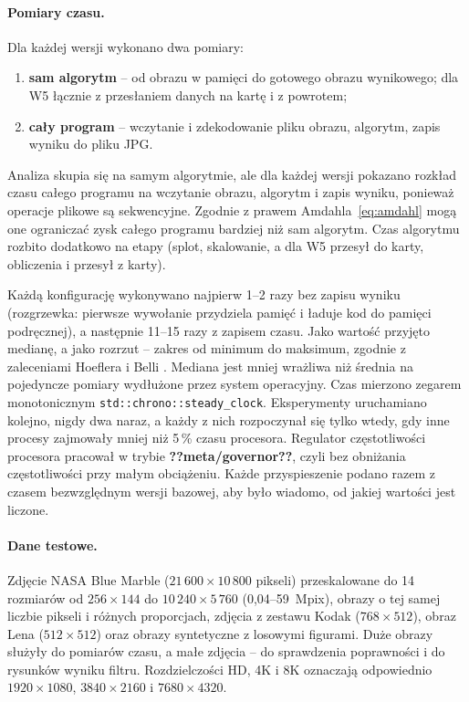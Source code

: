 \documentclass[12pt,a4paper]{article}
\providecommand{\wynik}[1]{\textbf{??#1??}}
\newcommand{\kod}[1]{\texttt{#1}}
\begin{document}
\paragraph{Pomiary czasu.} Dla każdej wersji wykonano dwa pomiary:
\begin{enumerate}
	\item \textbf{sam algorytm} -- od obrazu w pamięci do gotowego obrazu wynikowego; dla W5 łącznie z przesłaniem danych na kartę i z powrotem;
	\item \textbf{cały program} -- wczytanie i zdekodowanie pliku obrazu, algorytm, zapis wyniku do pliku JPG.
\end{enumerate}
Analiza skupia się na samym algorytmie, ale dla każdej wersji pokazano rozkład czasu całego programu na wczytanie obrazu, algorytm i zapis wyniku, ponieważ operacje plikowe są sekwencyjne. Zgodnie z prawem Amdahla~\eqref{eq:amdahl} mogą one ograniczać zysk całego programu bardziej niż sam algorytm. Czas algorytmu rozbito dodatkowo na etapy (splot, skalowanie, a dla W5 przesył do karty, obliczenia i przesył z karty).

Każdą konfigurację wykonywano najpierw 1--2 razy bez zapisu wyniku (rozgrzewka: pierwsze wywołanie przydziela pamięć i ładuje kod do pamięci podręcznej), a następnie 11--15 razy z zapisem czasu. Jako wartość przyjęto medianę, a jako rozrzut -- zakres od minimum do maksimum, zgodnie z zaleceniami Hoeflera i Belli \cite{hoefler}. Mediana jest mniej wrażliwa niż średnia na pojedyncze pomiary wydłużone przez system operacyjny. Czas mierzono zegarem monotonicznym \kod{std::chrono::steady\_clock}. Eksperymenty uruchamiano kolejno, nigdy dwa naraz, a każdy z nich rozpoczynał się tylko wtedy, gdy inne procesy zajmowały mniej niż 5\,\% czasu procesora. Regulator częstotliwości procesora pracował w trybie \wynik{meta/governor}, czyli bez obniżania częstotliwości przy małym obciążeniu. Każde przyspieszenie podano razem z czasem bezwzględnym wersji bazowej, aby było wiadomo, od jakiej wartości jest liczone.

\paragraph{Dane testowe.} Zdjęcie NASA Blue Marble ($21\,600 \times 10\,800$ pikseli) \cite{nasa} przeskalowane do 14 rozmiarów od $256 \times 144$ do $10\,240 \times 5\,760$ (0,04--59~Mpix), obrazy o tej samej liczbie pikseli i różnych proporcjach, zdjęcia z zestawu Kodak \cite{kodak} ($768 \times 512$), obraz Lena ($512 \times 512$) oraz obrazy syntetyczne z losowymi figurami. Duże obrazy służyły do pomiarów czasu, a małe zdjęcia -- do sprawdzenia poprawności i do rysunków wyniku filtru. Rozdzielczości HD, 4K i 8K oznaczają odpowiednio $1920 \times 1080$, $3840 \times 2160$ i $7680 \times 4320$.
\end{document}
